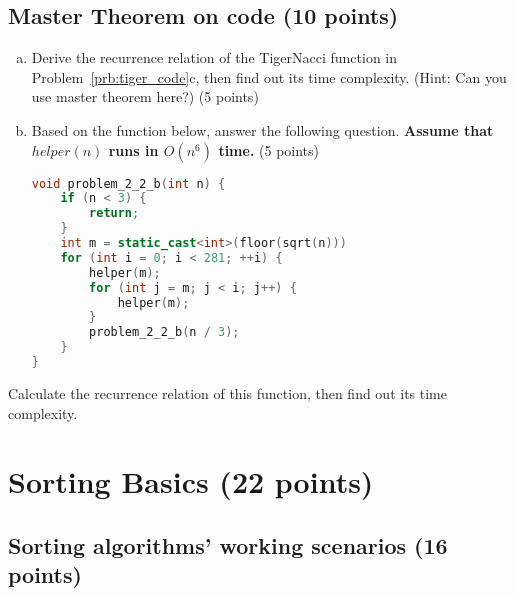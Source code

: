 \documentclass[11pt]{exam}
\begin{document}
\subsection{Master Theorem on code (10 points)}
\begin{enumerate}[(a)]

\item 
Derive the recurrence relation of the TigerNacci function in Problem~\ref{prb:tiger_code}c, then find out its time complexity.
(Hint: Can you use master theorem here?) (5 points)
\begin{solution}
\end{solution}

\item 
Based on the function below, answer the following question. \textbf{Assume that $helper(n)$ runs in $O(n^6)$ time.} (5 points)
\begin{lstlisting}[language=c++]
void problem_2_2_b(int n) {
	if (n < 3) {
		return;
	}
	int m = static_cast<int>(floor(sqrt(n)))
	for (int i = 0; i < 281; ++i) {
		helper(m);
		for (int j = m; j < i; j++) {
			helper(m);
		}
		problem_2_2_b(n / 3);
	}
}
\end{lstlisting}
\end{enumerate}
Calculate the recurrence relation of this function, then find out its time complexity.
\begin{solution}
\end{solution}


\section{Sorting Basics (22 points)}

\subsection{Sorting algorithms' working scenarios (16 points)}
\end{document}
